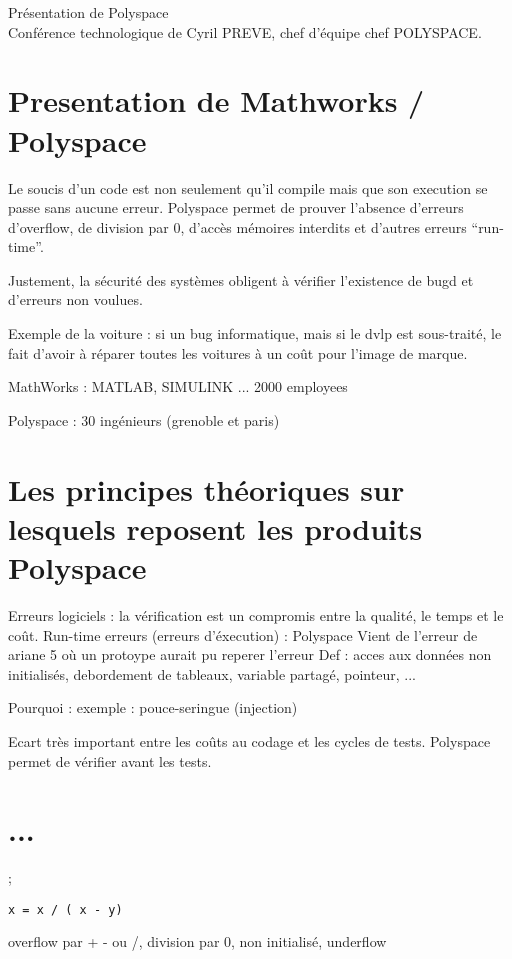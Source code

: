 \documentclass[a4paper,12pt]{article}
\begin{document}
\begin{center}
\Large{Présentation de Polyspace}\\
\vspace{0.4cm}
\normalsize{Conférence technologique de Cyril PREVE, chef d'équipe chef POLYSPACE.}\\
\end{center}

\section{Presentation de Mathworks / Polyspace}
Le soucis d'un code est non seulement qu'il compile mais que son execution se passe sans aucune erreur.
Polyspace permet de prouver l'absence d'erreurs d'overflow, de division par 0, d'accès mémoires interdits et d'autres erreurs ``run-time''.

Justement, la sécurité des systèmes obligent à vérifier l'existence de bugd et d'erreurs non voulues.

Exemple de la voiture : si un bug informatique, mais si le dvlp est sous-traité, le fait d'avoir à réparer toutes les voitures à un coût pour l'image de marque.

MathWorks : MATLAB, SIMULINK ...
2000 employees

Polyspace :
30 ingénieurs (grenoble et paris)

\section{Les principes théoriques sur lesquels reposent les produits Polyspace }

Erreurs logiciels : la vérification est un compromis entre la qualité, le temps et le coût.
Run-time erreurs (erreurs d'éxecution) : Polyspace 
Vient de l'erreur de ariane 5 où un protoype aurait pu reperer l'erreur
Def : acces aux données non initialisés, debordement de tableaux, variable partagé, pointeur, ...

Pourquoi :
exemple : pouce-seringue (injection)

Ecart très important entre les coûts au codage et les cycles de tests.
Polyspace permet de vérifier avant les tests.

\section{ ... };

\begin{verbatim} 
x = x / ( x - y)
\end{verbatim}
overflow par + - ou /, division par 0, non initialisé, underflow
\end{document}
